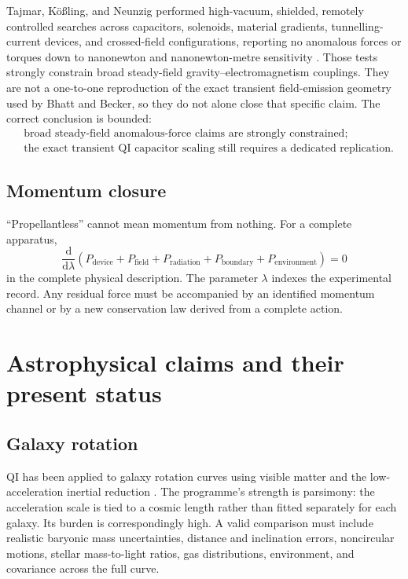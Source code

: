 \documentclass[11pt]{article}
\newcommand{\dd}{\mathrm{d}}
\begin{document}
Tajmar, K\"o{\ss}ling, and Neunzig performed high-vacuum, shielded, remotely controlled searches across capacitors, solenoids, material gradients, tunnelling-current devices, and crossed-field configurations, reporting no anomalous forces or torques down to nanonewton and nanonewton-metre sensitivity \cite{Tajmar2024}. Those tests strongly constrain broad steady-field gravity--electromagnetism couplings. They are not a one-to-one reproduction of the exact transient field-emission geometry used by Bhatt and Becker, so they do not alone close that specific claim. The correct conclusion is bounded:
\begin{equation}
\begin{split}
&\text{broad steady-field anomalous-force claims are strongly constrained;}\\
&\text{the exact transient QI capacitor scaling still requires a dedicated replication.}
\end{split}
\end{equation}

\subsection{Momentum closure}

``Propellantless'' cannot mean momentum from nothing. For a complete apparatus,
\begin{equation}
    \frac{\dd}{\dd\lambda}
    \left(
    P_{\mathrm{device}}+P_{\mathrm{field}}+P_{\mathrm{radiation}}
    +P_{\mathrm{boundary}}+P_{\mathrm{environment}}
    \right)=0
    \label{eq:momentum_ledger}
\end{equation}
in the complete physical description. The parameter \(\lambda\) indexes the experimental record. Any residual force must be accompanied by an identified momentum channel or by a new conservation law derived from a complete action.

\section{Astrophysical claims and their present status}
\label{sec:astro}

\subsection{Galaxy rotation}

QI has been applied to galaxy rotation curves using visible matter and the low-acceleration inertial reduction \cite{McCulloch2012,McCulloch2017Galaxy}. The programme's strength is parsimony: the acceleration scale is tied to a cosmic length rather than fitted separately for each galaxy. Its burden is correspondingly high. A valid comparison must include realistic baryonic mass uncertainties, distance and inclination errors, noncircular motions, stellar mass-to-light ratios, gas distributions, environment, and covariance across the full curve.
\end{document}
